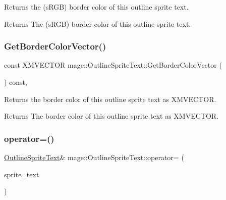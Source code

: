 Returns the (s\+R\+GB) border color of this outline sprite text.

\begin{DoxyReturn}{Returns}
The (s\+R\+GB) border color of this outline sprite text. 
\end{DoxyReturn}
\hypertarget{classmage_1_1_outline_sprite_text_a287bef30662bbd00ca999b3577249226}{}\label{classmage_1_1_outline_sprite_text_a287bef30662bbd00ca999b3577249226} 
\subsubsection{\texorpdfstring{Get\+Border\+Color\+Vector()}{GetBorderColorVector()}}
{\footnotesize\ttfamily const X\+M\+V\+E\+C\+T\+OR mage\+::\+Outline\+Sprite\+Text\+::\+Get\+Border\+Color\+Vector (\begin{DoxyParamCaption}{ }\end{DoxyParamCaption}) const\hspace{0.3cm}{\ttfamily [private]}, {\ttfamily [noexcept]}}

Returns the border color of this outline sprite text as {\ttfamily X\+M\+V\+E\+C\+T\+OR}.

\begin{DoxyReturn}{Returns}
The border color of this outline sprite text as {\ttfamily X\+M\+V\+E\+C\+T\+OR}. 
\end{DoxyReturn}
\hypertarget{classmage_1_1_outline_sprite_text_a324ec8e5c0d319b449895cc45d6b3807}{}\label{classmage_1_1_outline_sprite_text_a324ec8e5c0d319b449895cc45d6b3807} 
\subsubsection{\texorpdfstring{operator=()}{operator=()}\hspace{0.1cm}{\footnotesize\ttfamily [1/2]}}
{\footnotesize\ttfamily \hyperlink{classmage_1_1_outline_sprite_text}{Outline\+Sprite\+Text}\& mage\+::\+Outline\+Sprite\+Text\+::operator= (\begin{DoxyParamCaption}\item[{const \hyperlink{classmage_1_1_outline_sprite_text}{Outline\+Sprite\+Text} \&}]{sprite\+\_\+text }\end{DoxyParamCaption})\hspace{0.3cm}{\ttfamily [delete]}}


